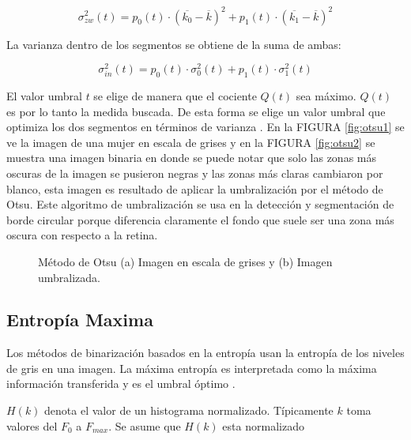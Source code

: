 \begin{equation}\sigma_{zw}^2(t) = p_0(t)\cdot(\overline{k_0} - \overline{k})^2 + p_1(t)\cdot(\overline{k_1} - \overline{k})^2\end{equation}

La varianza dentro de los segmentos se obtiene de la suma de ambas: 

\begin{equation}
\sigma_{in}^2(t) = p_0(t)\cdot\sigma_0^2(t) + p_1(t)\cdot\sigma_1^2(t)\end{equation}

%
%
El valor umbral $t$ se elige de manera que el cociente $Q(t)$ sea máximo. $Q(t)$ es por lo tanto la medida buscada. De esta forma se elige un valor umbral que optimiza los dos segmentos en términos de varianza \cite{gonzalez2013tecnicas}. En la FIGURA \ref{fig:otsu1} se ve la imagen  de una mujer en escala de grises y en la FIGURA \ref{fig:otsu2} se muestra una imagen binaria en donde se puede notar que solo las zonas más oscuras de la imagen se pusieron negras y las zonas más claras cambiaron por blanco, esta imagen es  resultado de aplicar la umbralización por el método de Otsu. Este algoritmo de umbralización se usa en la detección y segmentación de borde circular porque diferencia claramente el fondo que suele ser una zona más oscura con respecto a la retina.
    \begin{figure}[H]
	\centering
	\caption{Método de Otsu (a) Imagen en escala de grises y (b) Imagen umbralizada.}
	\label{fig:otsu}
\end{figure}
\subsection{Entropía Maxima}

Los métodos de binarización basados en la entropía usan la entropía de los niveles de gris en una imagen. La máxima entropía es interpretada como la máxima información 
transferida y es el umbral óptimo \cite{cattaneo2011metodos}.

$H(k)$ denota el valor de un histograma normalizado. Típicamente $k$ toma valores del $F_0$ a $F_{max}$. Se asume que $H(k)$  esta normalizado


